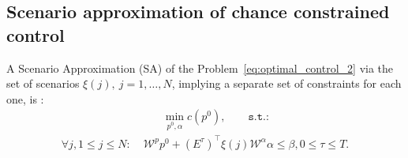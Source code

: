 \subsection{Scenario approximation of chance constrained control}
A Scenario Approximation (SA) of the Problem~\eqref{eq:optimal_control_2} via the set of scenarios $\xi(j), ~ j=1,\dots, N$, implying a separate set of constraints for each one, is%
:
\vspace{-3mm}
    \begin{align}
        & \qquad \min_{p^0, \alpha} c(p^0), \qquad \texttt{s.t.:}  \label{eq:optimal_control_sampling_02} 
        \\ 
         \forall j, 1\leq j \leq N\!\!:& \;  \mathcal{W}^p p^0 +  (E^\tau)^\top \xi(j) \mathcal{W}^{\alpha} \alpha \leq \beta, 0 \leq \tau \leq T.\nonumber
\end{align}

